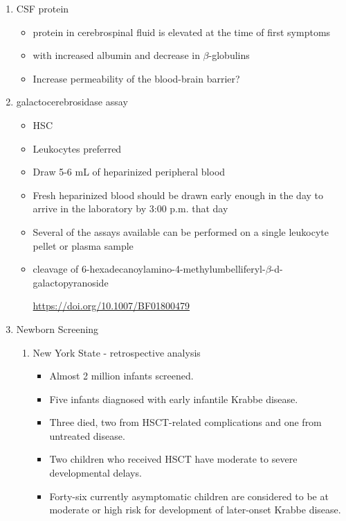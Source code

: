 \documentclass{scrartcl}
\begin{document}
\begin{enumerate}
\item CSF protein
\label{sec:orgb5c4375}
\begin{itemize}
\item protein in cerebrospinal fluid is elevated at the time of first symptoms
\item with increased albumin and decrease in \(\beta\)-globulins
\item Increase permeability of the blood-brain barrier?
\end{itemize}

\item galactocerebrosidase assay
\label{sec:org09459c5}

\begin{itemize}
\item HSC
\item Leukocytes preferred
\item Draw 5-6 mL of heparinized peripheral blood
\item Fresh heparinized blood should be drawn early enough in the day to arrive in the laboratory by 3:00 p.m. that day
\item Several of the assays available can be performed on a single leukocyte pellet or plasma sample

\item cleavage of 6-hexadecanoylamino-4-methylumbelliferyl-\(\beta\)-d-galactopyranoside

\url{https://doi.org/10.1007/BF01800479}
\end{itemize}


\item Newborn Screening
\label{sec:org00488c0}
\begin{enumerate}
\item New York State - retrospective analysis
\label{sec:orgbe279c0}
\begin{itemize}
\item Almost 2 million infants screened.
\item Five infants diagnosed with early infantile Krabbe disease.
\item Three died, two from HSCT-related complications and one from untreated disease.
\item Two children who received HSCT have moderate to severe developmental delays.
\item Forty-six currently asymptomatic children are considered to be at
moderate or high risk for development of later-onset Krabbe disease.
\end{itemize}
\end{enumerate}



\end{enumerate}
\end{document}
